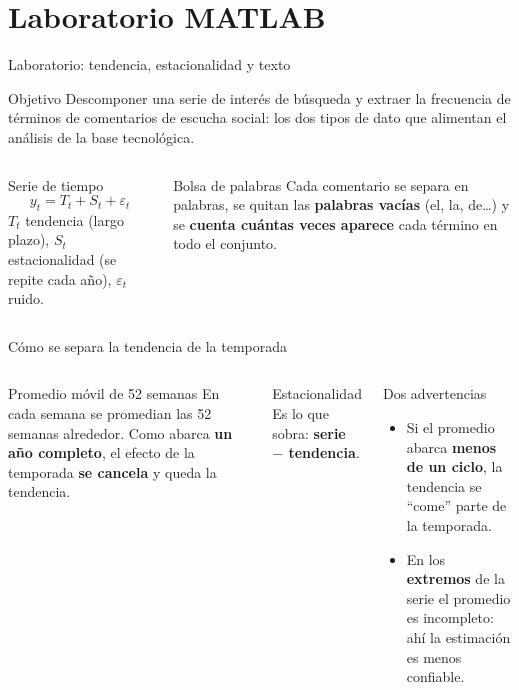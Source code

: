 \documentclass[aspectratio=169,xcolor=dvipsnames]{beamer}
\begin{document}
\section[Laboratorio]{Laboratorio MATLAB}

\begin{frame}{Laboratorio: tendencia, estacionalidad y texto}
\begin{block}{Objetivo}
  Descomponer una serie de interés de búsqueda y extraer la frecuencia de términos de comentarios de escucha social: los dos tipos de dato que alimentan el análisis de la base tecnológica.
\end{block}
\begin{columns}[T]
  \begin{exampleblock}{Serie de tiempo}
    \small
    \[ y_t = T_t + S_t + \varepsilon_t \]
    \scriptsize
    $T_t$ tendencia (largo plazo), $S_t$ estacionalidad (se repite cada año), $\varepsilon_t$ ruido.
  \end{exampleblock}
  \begin{block}{Bolsa de palabras}
    \scriptsize Cada comentario se separa en palabras, se quitan las \textbf{palabras vacías} (el, la, de\ldots) y se \textbf{cuenta cuántas veces aparece} cada término en todo el conjunto.
  \end{block}
\end{columns}
\end{frame}

\begin{frame}{Cómo se separa la tendencia de la temporada}
\begin{columns}[T]
  \begin{block}{Promedio móvil de 52 semanas}
    \small En cada semana se promedian las 52 semanas alrededor. Como abarca \textbf{un año completo}, el efecto de la temporada \textbf{se cancela} y queda la tendencia.
  \end{block}
  \begin{exampleblock}{Estacionalidad}
    \small Es lo que sobra: \textbf{serie $-$ tendencia}.
  \end{exampleblock}
  \begin{alertblock}{Dos advertencias}
    \scriptsize
    \begin{itemize}
      \item Si el promedio abarca \textbf{menos de un ciclo}, la tendencia se \enquote{come} parte de la temporada.
      \item En los \textbf{extremos} de la serie el promedio es incompleto: ahí la estimación es menos confiable.
    \end{itemize}
  \end{alertblock}
\end{columns}
\end{frame}
\end{document}
